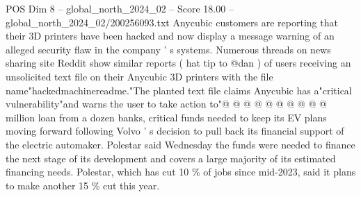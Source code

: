 \begin{textsample}{POS Dim 8 – global\_north\_2024\_02 – Score 18.00 – global\_north\_2024\_02/200256093.txt}
Anycubic customers are reporting that their 3D printers have been hacked and now display a message warning of an alleged security flaw in the company ' s systems.
Numerous threads on news sharing site Reddit show similar reports ( hat tip to @dan ) of users receiving an unsolicited text file on their Anycubic 3D printers with the file name"hackedmachinereadme."The planted text file claims Anycubic has a"critical vulnerability"and warns the user to take action to"@ @ @ @ @ @ @ @ @ @ million loan from a dozen banks, critical funds needed to keep its EV plans moving forward following Volvo ' s decision to pull back its financial support of the electric automaker.
Polestar said Wednesday the funds were needed to finance the next stage of its development and covers a large majority of its estimated financing needs.
Polestar, which has cut 10 \% of jobs since mid-2023, said it plans to make another 15 \% cut this year.

\end{textsample}
